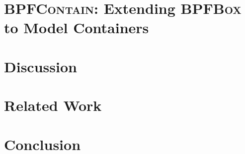 \documentclass[
  fontsize=12pt,
  paper=letter,
  twoside,
  cleardoublepage=plain,
]{scrbook}
\newcommand{\bpfbox}{\textsc{BPFBox}}
\newcommand{\bpfcontain}{\textsc{BPFContain}}
\begin{document}
\chapter{\bpfcontain: Extending \bpfbox{} to Model Containers}%
\label{c:bpfcontain}


\chapter{Discussion}%
\label{c:discussion}


\chapter{Related Work}%
\label{c:related}


\chapter{Conclusion}%
\label{c:conclusion}


\cleardoublepage%
\printbibliography%
%
\nocite{*} %
\end{document}
